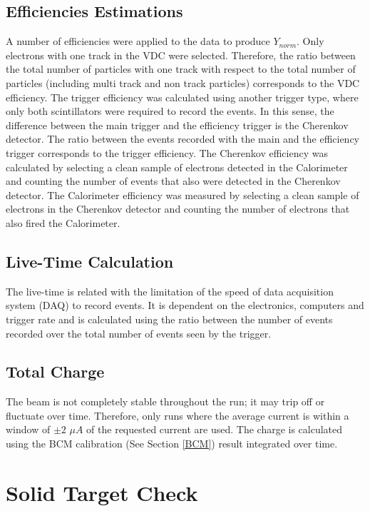 \documentclass[final,5p,times,twocolumn]{elsarticle}
\begin{document}
\subsection{Efficiencies Estimations } 
 
A number of efficiencies were applied to the data to produce $Y_{norm}$. Only electrons with one track in the VDC were selected. Therefore, the ratio between the total number of particles with one track with respect to the total number of particles (including multi track and non track particles) corresponds to the VDC efficiency. The trigger efficiency was calculated using another trigger type, where only both scintillators were required to record the events. In this sense, the difference between the main trigger and the efficiency trigger is the Cherenkov detector.  The ratio between the events recorded with the main and the efficiency trigger corresponds to the trigger efficiency. The Cherenkov efficiency was calculated by selecting a clean sample of electrons detected in the Calorimeter and counting the number of events that also were detected in the Cherenkov detector. The Calorimeter efficiency was measured by selecting a clean sample of electrons in the Cherenkov detector and counting the number of electrons that also fired the Calorimeter.

\subsection{Live-Time Calculation } 

The live-time is related with the limitation of the speed of data acquisition system (DAQ) to record events. It is dependent on the electronics, computers and trigger rate and is calculated using the ratio between the number of events recorded over the total number of events seen by the trigger. 

\subsection{ Total Charge}

The beam is not completely stable throughout the run; it may trip off or fluctuate over time. Therefore, only runs where the average current is within a window of $\pm 2$ $\mu A$ of the requested current are used. The charge is calculated using the BCM calibration (See Section \ref{BCM}) result integrated over time.

\section{Solid Target Check}
\end{document}
